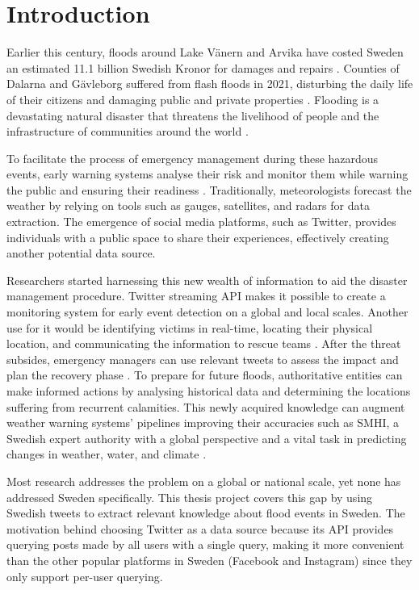 \chapter{Introduction}\label{sec:introduction}

Earlier this century, floods around Lake Vänern and Arvika have costed Sweden an estimated 11.1
billion Swedish Kronor for damages and repairs \cite{RiverFloodsSweden2022}. Counties of Dalarna and
Gävleborg suffered from flash floods in 2021, disturbing the daily life of their citizens and
damaging public and private properties \cite{daviesSwedenFlashFloods2021}. Flooding is a devastating
natural disaster that threatens the livelihood of people and the infrastructure of communities
around the world \cite{Floodlist2021}.

To facilitate the process of emergency management during these hazardous events, early warning
systems analyse their risk and monitor them while warning the public and ensuring their readiness
\cite{contributorsEarlyWarningSystem2022}. Traditionally, meteorologists forecast the weather by
relying on tools such as gauges, satellites, and radars for data extraction. The emergence of social
media platforms, such as Twitter, provides individuals with a public space to share their
experiences, effectively creating another potential data source.

Researchers started harnessing this new wealth of information to aid the disaster management
procedure. Twitter streaming \ac{API} makes it possible to create a monitoring system for early
event detection on a global \cite{debruijnGlobalDatabaseHistoric2019b} and local
\cite{barkerDevelopmentNationalscaleRealtime2019} scales. Another use for it would be identifying
victims in real-time, locating their physical location, and communicating the information to rescue
teams \cite{singhEventClassificationLocation2019}. After the threat subsides, emergency managers can
use relevant tweets to assess the impact and plan the recovery phase
\cite{barkerDevelopmentNationalscaleRealtime2019}. To prepare for future floods, authoritative
entities can make informed actions by analysing historical data and determining the locations
suffering from recurrent calamities. This newly acquired knowledge can augment weather warning
systems' pipelines improving their accuracies such as \ac{SMHI}, a Swedish expert authority with a
global perspective and a vital task in predicting changes in weather, water, and climate
\cite{SMHI2021}.

Most research addresses the problem on a global or national scale, yet none has addressed Sweden
specifically. This thesis project covers this gap by using Swedish tweets to extract relevant
knowledge about flood events in Sweden. The motivation behind choosing Twitter as a data source 
because its \ac{API} provides querying posts made by all users with a single query, making it more
convenient than the other popular platforms in Sweden (Facebook and Instagram) since they only
support per-user querying.

